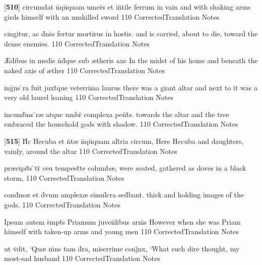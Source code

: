 \latline
  {[\textbf{510}] circumdat n\={}qu\={\macron {\i}}quam umer\={\macron {\i}}s et in\={}tile ferrum}
  { in vain and with shaking arms girds himself with an unskilled sword }
  {110}
  { CorrectedTranslation }
  { Notes }


\latline
  {cingitur, ac d\={}ns\={}s fertur morti\={}rus in host\={\i}s.}
  { and is carried, about to die, toward the dense enemies. }
  {110}
  { CorrectedTranslation }
  { Notes }


\latline
  {{\AE}dibus in medi\={\macron {\i}}s n\={}d\={}que sub {\ae}theris axe}
  { In the midst of his home and beneath the naked axis of {\ae}ther }
  {110}
  { CorrectedTranslation }
  { Notes }


\latline
  {ing\={}ns \={}ra fuit juxt\={}que veterrima laurus}
  { there was a giant altar and next to it was a very old laurel leaning }
  {110}
  { CorrectedTranslation }
  { Notes }


\latline
  {incumb\={}ns \={}r{\ae} atque umbr\={} complexa pen\={}t\={\macron {\i}}s.}
  { towards the altar and the tree embraced the household gods with shadow. }
  {110}
  { CorrectedTranslation }
  { Notes }


\latline
  {[\textbf{515}] H\={\macron {\i}}c Hecuba et n\={}t{\ae} n\={}qu\={\macron {\i}}quam alt\={}ria circum,}
  { Here Hecuba and daughters, vainly, around the altar }
  {110}
  { CorrectedTranslation }
  { Notes }


\latline
  {pr{\ae}cipit\={}s \={}tr\={} ceu tempest\={}te columb{\ae},}
  { were seated, gathered as doves in a black storm, }
  {110}
  { CorrectedTranslation }
  { Notes }


\latline
  {cond\={}ns{\ae} et d\={\macron {\i}}vum amplex{\ae} simul\={}cra sed\={}bant.}
  { thick and holding images of the gods. }
  {110}
  { CorrectedTranslation }
  { Notes }


\latline
  {Ipsum autem s\={}mpt\={\macron {\i}}s Priamum juven\={}libus arm\={\macron {\i}}s}
  { However when she was Priam himself with taken-up arms and young men }
  {110}
  { CorrectedTranslation }
  { Notes }


\latline
  {ut v\={\macron {\i}}dit, `Qu{\ae} m\={}ns tam d\={\macron {\i}}ra, miserrime conj\={}nx,}
  { `What such dire thought, my most-sad husband }
  {110}
  { CorrectedTranslation }
  { Notes }


